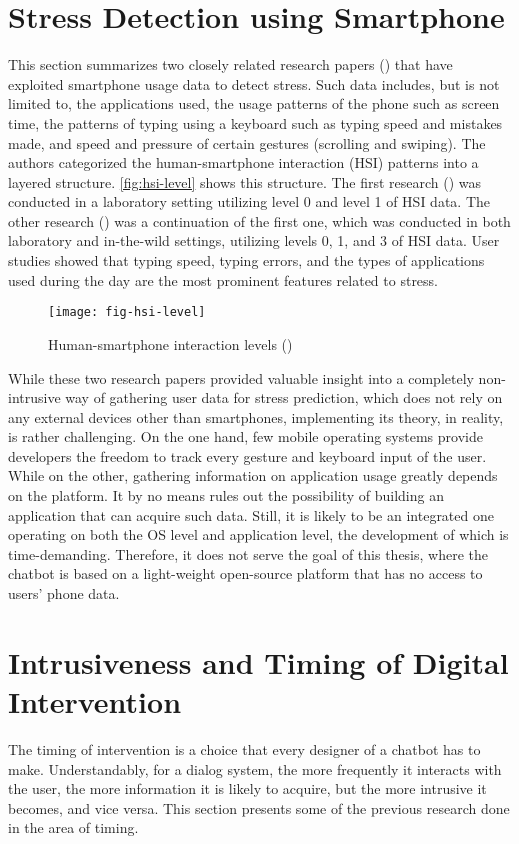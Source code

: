 \section{Stress Detection using Smartphone}
This section summarizes two closely related research papers (\cite{20_ciman, 21_ciman_2}) that have exploited smartphone usage data to detect stress. Such data includes, but is not limited to, the applications used, the usage patterns of the phone such as screen time, the patterns of typing using a keyboard such as typing speed and mistakes made, and speed and pressure of certain gestures (scrolling and swiping). The authors categorized the human-smartphone interaction (HSI) patterns into a layered structure. \autoref{fig:hsi-level} shows this structure. The first research (\cite{20_ciman}) was conducted in a laboratory setting utilizing level 0 and level 1 of HSI data. The other research (\cite{21_ciman_2}) was a continuation of the first one, which was conducted in both laboratory and in-the-wild settings, utilizing levels 0, 1, and 3 of HSI data. User studies showed that typing speed, typing errors, and the types of applications used during the day are the most prominent features related to stress.

\begin{figure}[ht]
  \centering
  \texttt{[image: fig-hsi-level]}
  \caption{Human-smartphone interaction levels (\cite{21_ciman_2})}
  \label{fig:hsi-level}
\end{figure}

While these two research papers provided valuable insight into a completely non-intrusive way of gathering user data for stress prediction, which does not rely on any external devices other than smartphones, implementing its theory, in reality, is rather challenging. On the one hand, few mobile operating systems provide developers the freedom to track every gesture and keyboard input of the user. While on the other, gathering information on application usage greatly depends on the platform. It by no means rules out the possibility of building an application that can acquire such data. Still, it is likely to be an integrated one operating on both the OS level and application level, the development of which is time-demanding. Therefore, it does not serve the goal of this thesis, where the chatbot is based on a light-weight open-source platform that has no access to users' phone data.

\section{Intrusiveness and Timing of Digital Intervention}\label{section:timing}
The timing of intervention is a choice that every designer of a chatbot has to make. Understandably, for a dialog system, the more frequently it interacts with the user, the more information it is likely to acquire, but the more intrusive it becomes, and vice versa. This section presents some of the previous research done in the area of timing.\bigskip

